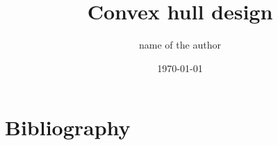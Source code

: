 \documentclass[10pt]{article}
\title{Convex hull design}
\author{name of the author}
\date{\today}
\begin{document}
\titlepage
\maketitle

\thispagestyle{empty}

\newpage

\tableofcontents















\section{Bibliography}



\end{document}
